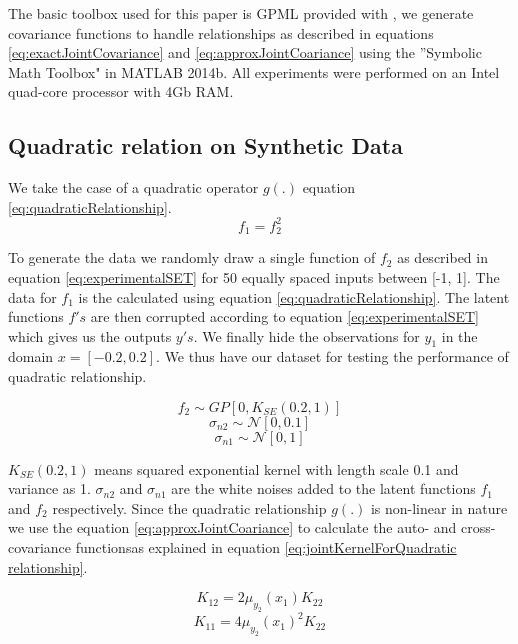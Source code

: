The basic toolbox used for this paper is GPML provided with \cite{Rasmussen2005}, we generate covariance functions to handle relationships as described in equations \ref{eq:exactJointCovariance} and \ref{eq:approxJointCoariance} using the ''Symbolic Math Toolbox" in MATLAB 2014b. All experiments were performed on an Intel quad-core processor with 4Gb RAM.

\subsection{Quadratic relation on Synthetic Data}\label{sub:experimentsSyntheticData}
We take the case of a quadratic operator \(g(.)\) equation \ref{eq:quadraticRelationship}. 
\begin{equation}\label{eq:quadraticRelationship}
f_{1} = f_{2}^2
\end{equation}

To generate the data we randomly draw a single function of \(f_{2}\) as described in equation \ref{eq:experimentalSET} for 50 equally spaced inputs between [-1, 1]. The data for \(f_{1}\) is the calculated using equation \ref{eq:quadraticRelationship}. The latent functions \(f's\) are then corrupted according to equation \ref{eq:experimentalSET} which gives us the outputs \(y's\). We finally hide the observations for \(y_{1}\) in the domain \(x = [-0.2, 0.2]\). We thus have our dataset for testing the performance of quadratic relationship. 

\begin{equation*}
f_{2} \sim  GP[0, K_{SE}(0.2, 1)]
\end{equation*}
\begin{equation*}
\sigma_{n2} \sim \mathcal{N}[0, 0.1]
\end{equation*}
\begin{equation}\label{eq:experimentalSET}
\sigma_{n1} \sim \mathcal{N}[0, 1]
\end{equation}
     
\(K_{SE}(0.2, 1)\) means squared exponential kernel with length scale 0.1 and variance as 1. \(\sigma_{n2}\) and \(\sigma_{n1}\) are the white noises added to the latent functions \(f_{1}\) and \(f_{2}\) respectively. Since the quadratic relationship \(g(.)\) is non-linear in nature we use the equation \ref{eq:approxJointCoariance} to calculate the auto- and cross-covariance functionsas explained in equation \ref{eq:jointKernelForQuadratic relationship}. 

\begin{equation*}
K_{12} = 2\mu_{y_{2}}(x_{1})K_{22}
\end{equation*}
\begin{equation}\label{eq:jointKernelForQuadratic relationship}
K_{11} = 4\mu_{y_{2}}(x_{1})^2K_{22}
\end{equation}


